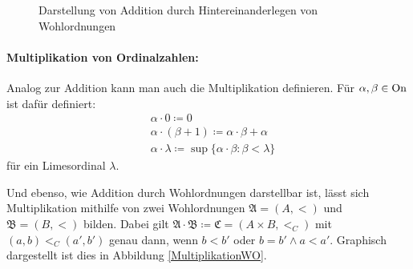 \begin{figure}[h]
	\begin{center}
	\end{center}
	\caption{Darstellung von Addition durch \glqq Hintereinanderlegen\grqq{} von Wohlordnungen}
	\label{AdditionWO}
\end{figure}

\paragraph{Multiplikation von Ordinalzahlen:} 
Analog zur Addition kann man auch die Multiplikation definieren. Für $\alpha,\beta\in \operatorname{On}$ ist dafür definiert:
\begin{align*}
	&\alpha\cdot0\coloneqq 0\\
	&\alpha\cdot(\beta+1)\coloneqq\alpha\cdot\beta+\alpha\\
	&\alpha\cdot\lambda\coloneqq\sup\{\alpha\cdot\beta : \beta<\lambda\}
\end{align*}
für ein Limesordinal $\lambda$.

Und ebenso, wie Addition durch Wohlordnungen darstellbar ist, lässt sich Multiplikation mithilfe von zwei Wohlordnungen $\mathfrak{A}=(A,<)$ und $\mathfrak{B}=(B,<)$ bilden. Dabei gilt $\mathfrak{A}\cdot\mathfrak{B}\coloneqq\mathfrak{C}=(A\times B, <_C)$ mit $(a,b)<_C(a',b')$ genau dann, wenn $b<b'$ oder $b=b'\land a<a'$. Graphisch dargestellt ist dies in Abbildung \ref{MultiplikationWO}.
	
